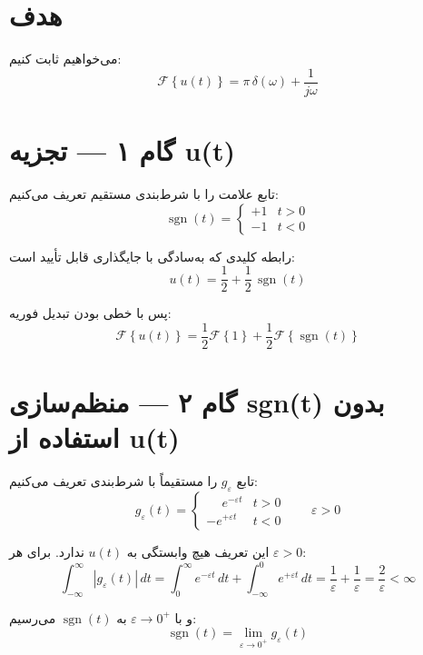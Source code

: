 
\newcommand{\F}[1]{\mathcal{F}\!\left\{#1\right\}}
\newcommand{\sgn}{\operatorname{sgn}}


\section*{هدف}
 
می‌خواهیم ثابت کنیم:
\[
  \F{u(t)} = \pi\,\delta(\omega) + \frac{1}{j\omega}
\]
 
\section*{گام ۱ --- تجزیه \textenglish{u(t)}}
 
تابع علامت را با شرط‌بندی مستقیم تعریف می‌کنیم:
\[
  \sgn(t) =
  \begin{cases}
    +1 & t > 0 \\
    -1 & t < 0
  \end{cases}
\]
 
رابطه کلیدی که به‌سادگی با جایگذاری قابل تأیید است:
\[
  \boxed{u(t) = \frac{1}{2} + \frac{1}{2}\,\sgn(t)}
\]
 
پس با خطی بودن تبدیل فوریه:
\[
  \F{u(t)} = \frac{1}{2}\F{1} + \frac{1}{2}\F{\sgn(t)}
\]
 
\section*{گام ۲ --- منظم‌سازی \textenglish{sgn(t)} بدون استفاده از \textenglish{u(t)}}
 
تابع $g_\varepsilon$ را مستقیماً با شرط‌بندی تعریف می‌کنیم:
\[
  g_\varepsilon(t) =
  \begin{cases}
    \phantom{-}e^{-\varepsilon t} & t > 0 \\[4pt]
    -e^{+\varepsilon t}           & t < 0
  \end{cases}
  \qquad \varepsilon > 0
\]
 
این تعریف هیچ وابستگی به $u(t)$ ندارد. برای هر $\varepsilon > 0$:
\[
  \int_{-\infty}^{\infty}|g_\varepsilon(t)|\,dt
  = \int_{0}^{\infty} e^{-\varepsilon t}\,dt + \int_{-\infty}^{0} e^{+\varepsilon t}\,dt
  = \frac{1}{\varepsilon} + \frac{1}{\varepsilon}
  = \frac{2}{\varepsilon} < \infty
\]
 
و با $\varepsilon \to 0^+$ به $\sgn(t)$ می‌رسیم:
\[
  \sgn(t) = \lim_{\varepsilon \to 0^+} g_\varepsilon(t)
\]
 
